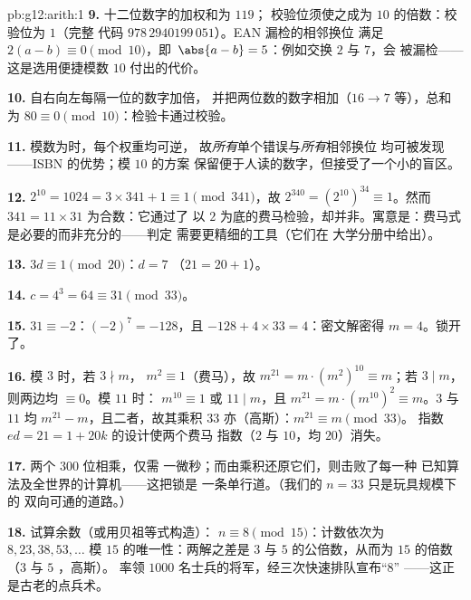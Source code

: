 \begin{solution}{pb:g12:arith:1}
\textbf{9.} 十二位数字的加权和为 $119$；
校验位须使之成为 $10$ 的倍数：校验位为 $1$（完整
代码 $978\,2940199\,051$）。EAN 漏检的相邻换位
满足 $2(a - b) \equiv 0 \pmod{10}$，即\
$\abs{a - b} = 5$：例如交换 $2$ 与 $7$，会
被漏检——这是选用便捷模数 $10$ 付出的代价。

\textbf{10.} 自右向左每隔一位的数字加倍，
并把两位数的数字相加（$16 \to 7$ 等），总和为 $80 \equiv 0
\pmod{10}$：检验卡通过校验。

\textbf{11.} 模数为时，每个权重均可逆，
故\emph{所有}单个错误与\emph{所有}相邻换位
均可被发现——ISBN 的优势；模 $10$ 的方案
保留便于人读的数字，但接受了一个小的盲区。

\textbf{12.} $2^{10} = 1024 = 3 \times 341 + 1 \equiv 1
\pmod{341}$，故 $2^{340} = \left(2^{10}\right)^{34} \equiv
1$。然而 $341 = 11 \times 31$ 为合数：它通过了
以 $2$ 为底的费马检验，却并非。寓意是：费马式
是必要的而非充分的——\omterm{def:g12:arith:prime}{质数}判定
需要更精细的工具（它们在
大学分册中给出）。

\textbf{13.} $3d \equiv 1 \pmod{20}$：$d = 7$
（$21 = 20 + 1$）。

\textbf{14.} $c = 4^3 = 64 \equiv 31 \pmod{33}$。

\textbf{15.} $31 \equiv -2$：$(-2)^7 = -128$，且
$-128 + 4 \times 33 = 4$：密文解密得
$m = 4$。锁开了。

\textbf{16.} 模 $3$ 时，若 $3 \nmid m$，
$m^2 \equiv 1$（费马），故
$m^{21} = m \cdot \left(m^2\right)^{10} \equiv m$；若
$3 \mid m$，则两边均 $\equiv 0$。模 $11$ 时：
$m^{10} \equiv 1$ 或 $11 \mid m$，且
$m^{21} = m \cdot \left(m^{10}\right)^2 \equiv m$。$3$ 与
$11$ 均 $m^{21} - m$，且二者，故其乘积
$33$ 亦\omterm{def:g12:arith:divides}{整除}（高斯）：$m^{21} \equiv m \pmod{33}$。
指数 $ed = 21 = 1 + 20k$ 的设计使两个费马
指数（$2$ 与 $10$，均 $20$）消失。

\textbf{17.} 两个 $300$ 位相乘，仅需
一微秒；而由乘积还原它们，则击败了每一种
已知算法及全世界的计算机——这把锁是
一条单行道。（我们的 $n = 33$ 只是玩具规模下的
双向可通的道路。）

\textbf{18.} 试算余数（或用贝祖等式构造）：
$n \equiv 8 \pmod{15}$：计数依次为 $8, 23, 38, 53, \dots$
模 $15$ 的唯一性：两解之差是
$3$ 与 $5$ 的公倍数，从而为 $15$ 的倍数（$3$ 与 $5$ ，高斯）。
率领 $1000$ 名士兵的将军，经三次快速排队宣布“$8$”
——这正是古老的点兵术。


\end{solution}
